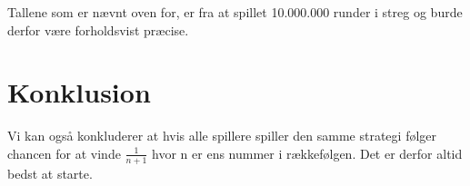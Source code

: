 \documentclass[a4paper, 12pt]{article}
\begin{document}
Tallene som er nævnt oven for, er fra at spillet 10.000.000 runder i streg og burde derfor være forholdsvist præcise. 

\section{Konklusion}


Vi kan også konkluderer at hvis alle spillere spiller den samme strategi følger chancen for at vinde $\frac{1}{n+1}$ hvor n er ens nummer i rækkefølgen. Det er derfor altid bedst at starte.


\bigbreak



\vfill
\pagebreak
\end{document}
